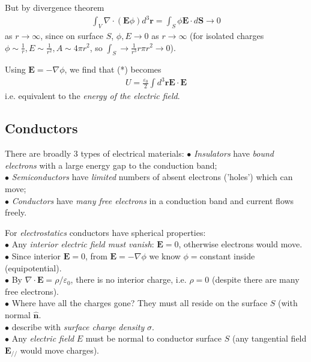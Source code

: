 \documentclass[a4paper]{article}
\begin{document}
But by divergence theorem
\begin{equation*}
\begin{aligned}
\int_V \nabla \cdot (\mathbf{E}\phi) d^3 \mathbf{r} = \int_S \phi \mathbf{E} \cdot d\mathbf{S} \to 0
\end{aligned}
\end{equation*}
as $r \to \infty$, since on surface $S$, $\phi, E \to 0$ as $r \to \infty$ (for isolated charges $\phi \sim \frac{1}{r}, E\sim \frac{1}{r^2}, A \sim 4\pi r^2$, so $\int_S \to \frac{1}{r^3}r\pi r^2 \to 0$).

Using $\mathbf{E} = -\nabla \phi$, we find that (*) becomes
\begin{equation*}\tag{2.27} \label{eq:2.27}
\begin{aligned}
U = \frac{\varepsilon_0}{2} \int d^3 \mathbf{r} \mathbf{E} \cdot \mathbf{E}
\end{aligned}
\end{equation*}
i.e. equivalent to the \emph{energy of the electric field}.

\subsection{Conductors}
There are broadly 3 types of electrical materials:
$\bullet$ \emph{Insulators} have \emph{bound electrons} with a large energy gap to the conduction band;\\
$\bullet$ \emph{Semiconductors} have \emph{limited} numbers of absent electrons ('holes') which can move;\\
$\bullet$ \emph{Conductors} have \emph{many free electrons} in a conduction band and current flows freely.

For \emph{electrostatics} conductors have spherical properties:\\
$\bullet$ Any \emph{interior electric field must vanish}: $\mathbf{E} = 0$, otherwise electrons would move.\\
$\bullet$ Since interior $\mathbf{E} = 0$, from $\mathbf{E} = -\nabla \phi$ we know $\phi=$constant inside (equipotential).\\
$\bullet$ By $\nabla \cdot \mathbf{E} = \rho/\varepsilon_0$, there is no interior charge, i.e. $\rho = 0$ (despite there are many free electrons).\\
$\bullet$ Where have all the charges gone? They must all reside on the surface $S$ (with normal $\hat{\mathbf{n}}$.\\
$\bullet$ describe with \emph{surface charge density} $\sigma$.\\
$\bullet$ Any \emph{electric field} $E$ must be normal to conductor surface $S$ (any tangential field $\mathbf{E}_{//}$ would move charges).
\end{document}
